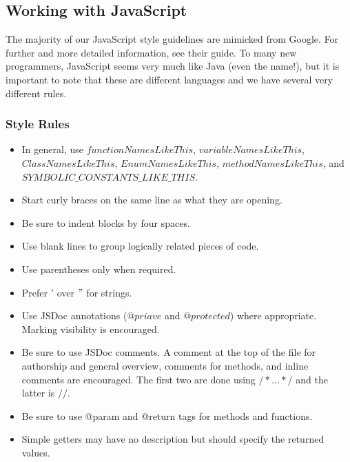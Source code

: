 \documentclass[12pt]{article}
\begin{document}
\subsection{Working with JavaScript}
The majority of our JavaScript style guidelines are mimicked from Google\cite{JavaScriptStyle-Google}.  For further and more detailed information, see their guide.  To many new programmers, JavaScript seems very much like Java (even the name!), but it is important to note that these are different languages and we have several very different rules.

\subsubsection{Style Rules}
\begin{itemize}
\item In general, use $functionNamesLikeThis$, $variableNamesLikeThis$, $ClassNamesLikeThis$, $EnumNamesLikeThis$, $methodNamesLikeThis$, and $SYMBOLIC\_CONSTANTS\_LIKE\_THIS$.
\item Start curly braces on the same line as what they are opening.
\item Be sure to indent blocks by four spaces.
\item Use blank lines to group logically related pieces of code.
\item Use parentheses only when required.
\item Prefer $'$ over $"$ for strings.
\item Use JSDoc annotations ($@priave$ and $@protected$) where appropriate.  Marking visibility is encouraged.
\item Be sure to use JSDoc comments.  A comment at the top of the file for authorship and general overview, comments for methods, and inline comments are encouraged.  The first two are done using $/*. . . */$ and the latter is $//$.
\item Be sure to use @param and @return tags for methods and functions.
\item Simple getters may have no description but should specify the returned values.
\end{itemize}
\end{document}
